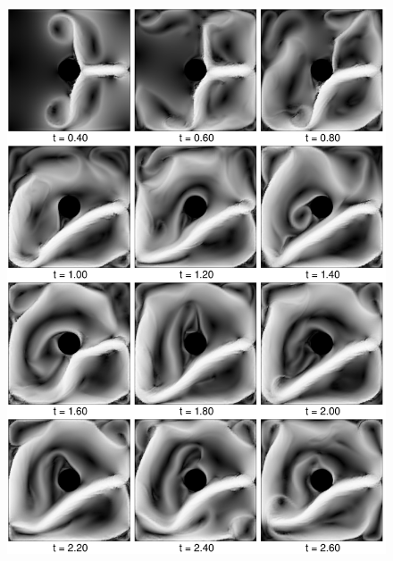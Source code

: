 \begin{figure}[htbp]
    \includegraphics[width=\textwidth]{figures/navier_stokes/navier_1.png}
    \label{fig:navier_1}
\end{figure}

